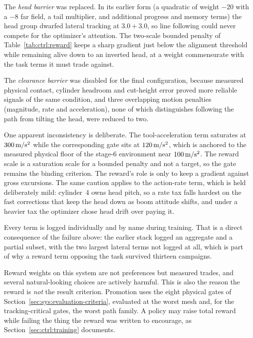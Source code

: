 The \emph{head barrier} was replaced. In its earlier form
(a quadratic of weight $-20$ with a $-8$ far field, a tail multiplier, and
additional progress and memory terms) the head group dwarfed lateral tracking at $3.0+3.0$, so
line following could never compete for the optimizer's attention. The
two-scale bounded penalty of Table~\ref{tab:ctrl:reward} keeps a sharp gradient
just below the alignment threshold while remaining alive down to an inverted
head, at a weight commensurate with the task terms it must trade against.

The \emph{clearance barrier} was disabled for the final configuration, because
measured physical contact, cylinder headroom and cut-height error proved more
reliable signals of the same condition, and three overlapping motion penalties
(magnitude, rate and acceleration), none of which distinguishes following
the path from tilting the head, were reduced to two.

One apparent inconsistency is deliberate. The tool-acceleration term saturates
at $\unit[300]{m/s^2}$ while the corresponding gate sits at
$\unit[120]{m/s^2}$, which is anchored to the measured physical floor of the
stage-6 environment near $\unit[100]{m/s^2}$. The reward scale is a saturation
scale for a bounded penalty and not a target, so the gate remains the binding
criterion. The reward's role is only to keep a gradient against gross
excursions. The same caution applies to the action-rate term, which is held
deliberately mild: cylinder~4 owns head pitch, so a rate tax falls hardest on the fast corrections that keep the head down as boom attitude shifts,
and under a heavier tax the optimizer chose head drift over paying it.

Every term is logged individually and by name during training. That is a direct
consequence of the failure above: the earlier stack logged an aggregate and a
partial subset, with the two largest lateral terms not logged at all, which is
part of why a reward term opposing the task survived thirteen campaigns.

Reward weights on this system are not preferences but measured trades,
and several natural-looking choices are actively harmful. This is also the reason the reward is \emph{not} the result criterion.
Promotion uses the eight physical gates of
Section~\ref{sec:sys:evaluation-criteria}, evaluated at the worst mesh and, for
the tracking-critical gates, the worst path family. A policy may raise total
reward while failing the thing the reward was written to encourage, as Section~\ref{sec:ctrl:training} documents.

